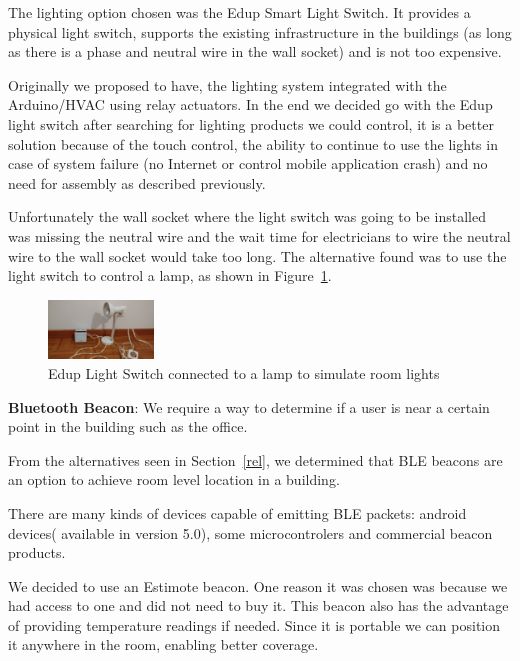 \documentclass[conference]{IEEEtran}
\begin{document}
The lighting option chosen was the Edup Smart Light Switch. It provides a physical light switch, supports the existing infrastructure in the buildings (as long as there is a phase and neutral wire in the wall socket) and is not too expensive.


Originally we proposed to have, the lighting system integrated with the Arduino/\ac{HVAC} using relay actuators. In the end we decided go with the Edup light switch after searching for lighting products we could control, it is a better solution because of the touch control, the ability to continue to use the lights in case of system failure (no Internet or control mobile application crash) and no need for assembly as described previously.

Unfortunately the wall socket where the light switch was going to be installed was missing the neutral wire and the wait time for electricians to wire the neutral wire to the wall socket would take too long. The alternative found was to use the light switch to control a lamp, as shown in Figure~\ref{imp_light_switch_light}.


\begin{figure}[htbp]
\centering
\includegraphics[width=0.25\textwidth]{Figures/imp_light_switch_light}
\caption{Edup Light Switch connected to a lamp to simulate room lights}
\label{imp_light_switch_light}
\end{figure}


\textbf{Bluetooth Beacon}: We require a way to determine if a user is near a certain point in the building such as the office.

From the alternatives seen in Section~\ref{rel}, we  determined that \ac{BLE} beacons are an option to achieve room level location in a building.

There are many kinds of devices capable of emitting \ac{BLE} packets: android devices( available in version 5.0), some microcontrolers and commercial beacon products.

We decided to use an Estimote beacon. One reason it was chosen was because we had access to one and did not need to buy it. This beacon also has the advantage of providing temperature readings if needed. Since it is portable we can position it anywhere in the room, enabling better coverage.
\end{document}
